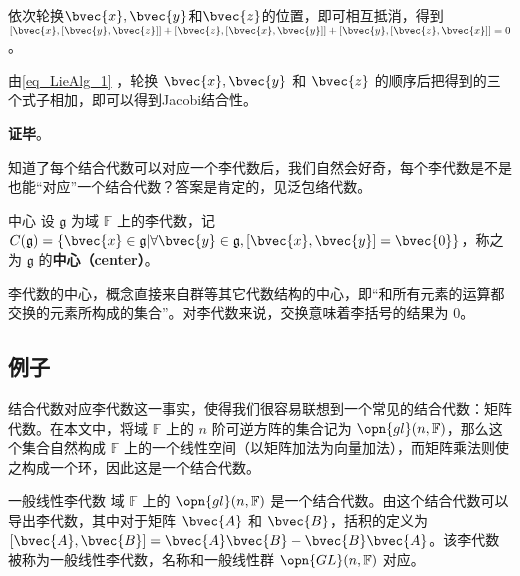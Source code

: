依次轮换$\bvec{x}, \bvec{y}$和$\bvec{z}$的位置，即可相互抵消，得到$[\bvec{x}, [\bvec{y}, \bvec{z}]]+[\bvec{z}, [\bvec{x}, \bvec{y}]]+[\bvec{y}, [\bvec{z}, \bvec{x}]]=0$。


由\autoref{eq_LieAlg_1} ，轮换 $\bvec{x}, \bvec{y}$ 和 $\bvec{z}$ 的顺序后把得到的三个式子相加，即可以得到Jacobi结合性。



\textbf{证毕}。

知道了每个结合代数可以对应一个李代数后，我们自然会好奇，每个李代数是不是也能“对应”一个结合代数？答案是肯定的，见泛包络代数。


\begin{definition}{中心}\label{def_LieAlg_1}
设 $\mathfrak{g}$ 为域 $\mathbb{F}$ 上的李代数，记 $C(\mathfrak{g})=\{\bvec{x}\in\mathfrak{g}|\forall\bvec{y}\in\mathfrak{g}, [\bvec{x}, \bvec{y}]=\bvec{0}\}$，称之为 $\mathfrak{g}$ 的\textbf{中心（center）}。
\end{definition}

李代数的中心，概念直接来自群等其它代数结构的中心，即“和所有元素的运算都交换的元素所构成的集合”。对李代数来说，交换意味着李括号的结果为 $0$。



\subsection{例子}

结合代数对应李代数这一事实，使得我们很容易联想到一个常见的结合代数：矩阵代数。在本文中，将域 $\mathbb{F}$ 上的 $n$ 阶可逆方阵的集合记为 $\opn{gl}(n, \mathbb{F})$，那么这个集合自然构成 $\mathbb{F}$ 上的一个线性空间（以矩阵加法为向量加法），而矩阵乘法则使之构成一个环，因此这是一个结合代数。

\begin{example}{一般线性李代数}
域 $\mathbb{F}$ 上的 $\opn{gl}(n, \mathbb{F})$ 是一个结合代数。由这个结合代数可以导出李代数，其中对于矩阵 $\bvec{A}$ 和 $\bvec{B}$，括积的定义为 $[\bvec{A}, \bvec{B}]=\bvec{A}\bvec{B}-\bvec{B}\bvec{A}$。该李代数被称为一般线性李代数，名称和一般线性群 $\opn{GL}(n, \mathbb{F})$ 对应。%
\end{example}

